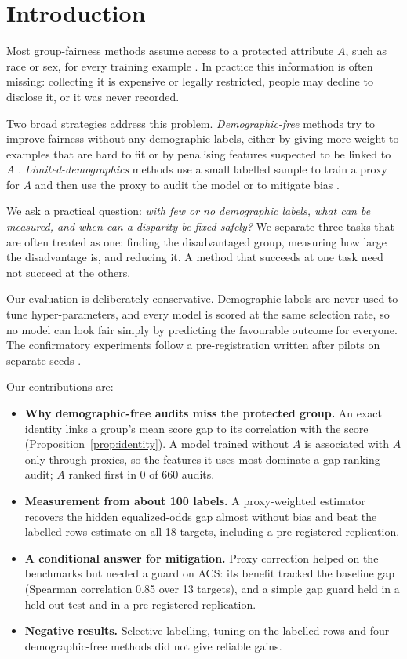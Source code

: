 \documentclass[conference]{IEEEtran}
\begin{document}
\section{Introduction}
Most group-fairness methods assume access to a protected attribute $A$, such as race or sex, for every training example \cite{hardt2016equality,agarwal2018reductions,kamiran2012data}. In practice this information is often missing: collecting it is expensive or legally restricted, people may decline to disclose it, or it was never recorded.

Two broad strategies address this problem. \emph{Demographic-free} methods try to improve fairness without any demographic labels, either by giving more weight to examples that are hard to fit \cite{hashimoto2018fairness,lahoti2020fairness,liu2021just,levy2020large} or by penalising features suspected to be linked to $A$ \cite{zhao2022towards}. \emph{Limited-demographics} methods use a small labelled sample to train a proxy for $A$ and then use the proxy to audit the model or to mitigate bias \cite{kenfack2024fairness,awasthi2021evaluating}.

We ask a practical question: \emph{with few or no demographic labels, what can be measured, and when can a disparity be fixed safely?} We separate three tasks that are often treated as one: finding the disadvantaged group, measuring how large the disadvantage is, and reducing it. A method that succeeds at one task need not succeed at the others.

Our evaluation is deliberately conservative. Demographic labels are never used to tune hyper-parameters, and every model is scored at the same selection rate, so no model can look fair simply by predicting the favourable outcome for everyone. The confirmatory experiments follow a pre-registration written after pilots on separate seeds \cite{nosek2018preregistration}.

Our contributions are:
\begin{itemize}
\item \textbf{Why demographic-free audits miss the protected group.} An exact identity links a group's mean score gap to its correlation with the score (Proposition~\ref{prop:identity}). A model trained without $A$ is associated with $A$ only through proxies, so the features it uses most dominate a gap-ranking audit; $A$ ranked first in 0 of 660 audits.
\item \textbf{Measurement from about 100 labels.} A proxy-weighted estimator recovers the hidden equalized-odds gap almost without bias and beat the labelled-rows estimate on all 18 targets, including a pre-registered replication.
\item \textbf{A conditional answer for mitigation.} Proxy correction helped on the benchmarks but needed a guard on ACS: its benefit tracked the baseline gap (Spearman correlation 0.85 over 13 targets), and a simple gap guard held in a held-out test and in a pre-registered replication.
\item \textbf{Negative results.} Selective labelling, tuning on the labelled rows and four demographic-free methods did not give reliable gains.
\end{itemize}
\end{document}
